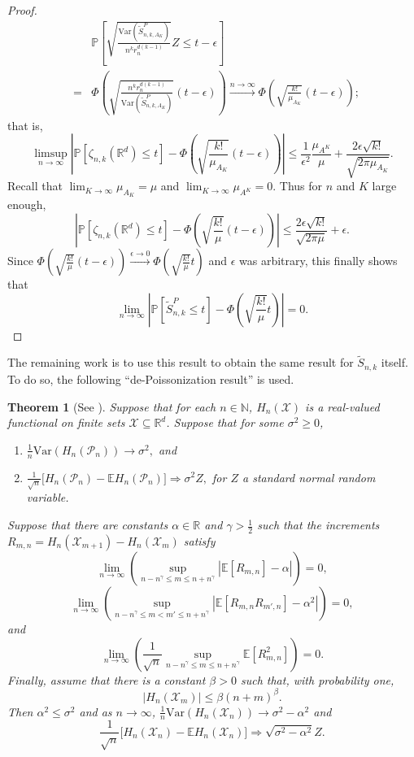 \documentclass{amsart}
\newtheorem{thm}{Theorem}[section]
\theoremstyle{definition}
\newcommand{\R}{\mathbb{R}}
\newcommand{\E}{\mathbb{E}}
\newcommand{\N}{\mathbb{N}}
\newcommand{\ds}{\displaystyle}
\newcommand{\X}{\mathcal{X}}
\renewcommand{\P}{\mathbb{P}}
\newcommand{\var}{\mathrm{Var}}
\newcommand{\s}{\widetilde{S}}
\newcommand{\p}{\mathcal{P}}
\renewcommand{\1}{\mathbb{1}}
\begin{document}
\begin{proof}
\begin{eqnarray*}
&&\P\left[\sqrt{\frac{\var(\s_{n,k,A_K}^P)}{n^kr_n^{d(k-1)}}}Z\le 
t-\epsilon\right]\\
&=&\Phi\left(\sqrt{\frac{n^kr_n^{d(k-1)}}{\var(\s_{n,k,A_K}^P)}}(t-
\epsilon)\right)\xrightarrow{n\to\infty}\Phi\left(\sqrt{\frac{k!}{\mu_{A_K}}}
(t-\epsilon)\right);
\end{eqnarray*}
that is, 
$$\limsup_{n\to\infty}\left|\P[\zeta_{n,k}(\R^d)\le t]-\Phi\left(\sqrt{
\frac{k!}{\mu_{A_K}}}(t-\epsilon)\right)\right|\le \frac{1}{\epsilon^2}
\frac{\mu_{A^K}}{\mu}+\frac{2\epsilon\sqrt{k!}}{\sqrt{2\pi\mu_{A_K}}}.$$
Recall that $\lim_{K\to\infty}\mu_{A_K}=\mu$ and $\lim_{K\to\infty}\mu_{A^K}=
0$.  Thus for $n$ and $K$ large enough, 
$$\left|\P[\zeta_{n,k}(\R^d)\le t]-\Phi\left(\sqrt{
\frac{k!}{\mu}}(t-\epsilon)\right)\right|\le \frac{2\epsilon\sqrt{k!}}{\sqrt{2\pi\mu}}+\epsilon.$$
Since $\Phi\left(\sqrt{
\frac{k!}{\mu}}(t-\epsilon)\right)\xrightarrow{\epsilon\to0}\Phi\left(
\sqrt{
\frac{k!}{\mu}}t\right)$ and $\epsilon$ was arbitrary, this finally
shows that
$$\lim_{n\to\infty}\left|\P[\s_{n,k}^P\le t]-\Phi\left(\sqrt{
\frac{k!}{\mu}}t\right)\right|=0.$$

\end{proof}

\medskip

The remaining work is to use this result to obtain the same 
result for $\s_{n,k}$ itself. 
To do so, the following ``de-Poissonization result'' is used.
\begin{thm}[See \cite{penrose}]\label{de-Poisson}
Suppose that for each $n\in\N$, $H_n(\X)$ is a real-valued functional on finite
sets $\X\subseteq\R^d$.  Suppose that for some $\sigma^2\ge 0$, 
\begin{enumerate}
\item $\ds\frac{1}{n}\var(H_n(\p_n))\longrightarrow\sigma^2,$
and
\item $\ds\frac{1}{\sqrt{n}}\big[H_n(\p_n)-\E H_n(\p_n)\big]
\Longrightarrow\sigma^2Z,$
for $Z$ a standard normal random variable.
\end{enumerate}
Suppose that there are constants $\alpha\in\R$ and $\gamma>\frac{1}{2}$ such
that the increments $R_{m,n}=H_n(\X_{m+1})-H_n(\X_m)$ satisfy
\begin{equation}\label{means}
\lim_{n\to\infty}\left(\sup_{n-n^\gamma\le m\le n+n^\gamma}|\E[R_{m,n}]-\alpha|
\right)=0,
\end{equation}
\begin{equation}\label{covs}
\lim_{n\to\infty}\left(\sup_{n-n^\gamma\le m<m'\le n+n^\gamma}|\E[R_{m,n}R_{m',n}]
-\alpha^2|\right)=0,
\end{equation}
and
\begin{equation}\label{vars}
\lim_{n\to\infty}\left(\frac{1}{\sqrt{n}}\sup_{n-n^\gamma\le m\le n+n^\gamma}
\E[R_{m,n}^2]\right)=0.
\end{equation}
Finally, assume that there is a constant $\beta>0$ such that, with probability
one, 
$$|H_n(\X_m)|\le\beta(n+m)^\beta.$$
Then $\alpha^2\le\sigma^2$ and as $n\to\infty$, $\frac{1}{n}\var(H_n(\X_n))
\to \sigma^2-\alpha^2$ and 
$$\frac{1}{\sqrt{n}}\big[H_n(\X_n)-\E H_n(\X_n)\big]\Longrightarrow
\sqrt{\sigma^2-\alpha^2}Z.$$

\end{thm}
\end{document}
